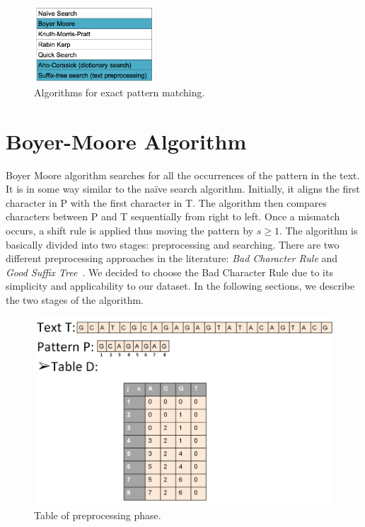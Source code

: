 \documentclass[paper=a4, fontsize=11pt]{scrartcl} %
\numberwithin{equation}{section} %
\numberwithin{figure}{section} %
\numberwithin{table}{section} %
\begin{document}
\begin{figure}[h!]
\centering
\includegraphics[width=0.4\textwidth]{figures/algorithms.png}
\caption{Algorithms for exact pattern matching.}
\label{fig:algorithms}
\end{figure}

\newpage
\section{Boyer-Moore Algorithm}
Boyer Moore algorithm \cite{bm_fast} searches for all the occurrences of the pattern in the text. It is in some way similar to the na\"ive search algorithm. Initially, it aligns the first character in P with the first character in T. The algorithm then compares characters between P and T sequentially from right to left. Once a mismatch occurs, a shift rule is applied thus moving the pattern by $s\ge 1$. The algorithm is basically divided into two stages: preprocessing and searching. There are two different preprocessing approaches in the literature: \textit{Bad Character Rule} and \textit{Good Suffix Tree}~\cite{bm_tbc}. We decided to choose the Bad Character Rule due to its simplicity and applicability to our dataset. In the following sections, we describe the two stages of the algorithm.

\begin{figure}[h!]
\centering
\includegraphics[width=\textwidth]{figures/Example_Table.png}
\caption{Table of preprocessing phase.}
\label{fig:table}
\end{figure}
\end{document}
